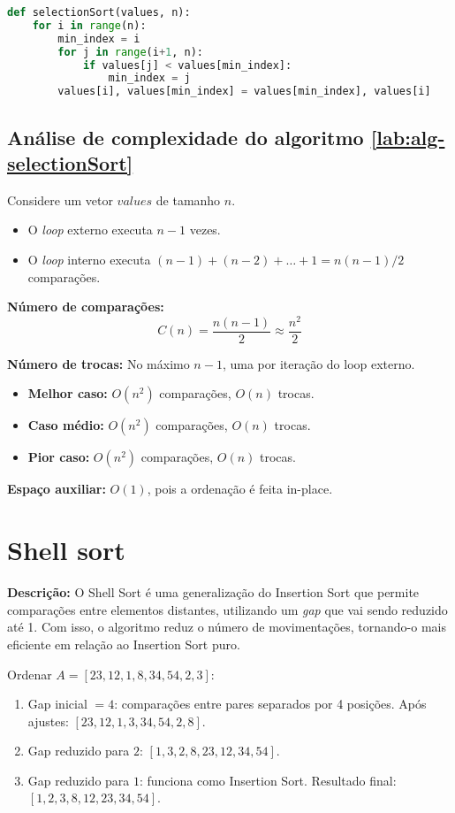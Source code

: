 \begin{lstlisting}[language=python,caption={Selection sort em Python},captionpos=t]
def selectionSort(values, n):
    for i in range(n):
        min_index = i
        for j in range(i+1, n):
            if values[j] < values[min_index]:
                min_index = j
        values[i], values[min_index] = values[min_index], values[i]
\end{lstlisting}

\subsection{Análise de complexidade do algoritmo \ref{lab:alg-selectionSort}}
Considere um vetor $values$ de tamanho $n$.

\begin{itemize}
    \item O \textit{loop} externo executa $n-1$ vezes.
    \item O \textit{loop} interno executa $(n-1)+(n-2)+\dots+1 = n(n-1)/2$ comparações.
\end{itemize}

\noindent\textbf{Número de comparações:}  
\[
C(n) = \frac{n(n-1)}{2} \approx \frac{n^2}{2}
\]

\noindent\textbf{Número de trocas:}  
No máximo $n-1$, uma por iteração do loop externo.

\begin{itemize}
    \item \textbf{Melhor caso:} $O(n^2)$ comparações, $O(n)$ trocas.
    \item \textbf{Caso médio:} $O(n^2)$ comparações, $O(n)$ trocas.
    \item \textbf{Pior caso:} $O(n^2)$ comparações, $O(n)$ trocas.
\end{itemize}

\noindent\textbf{Espaço auxiliar:} $O(1)$, pois a ordenação é feita in-place.

\section{Shell sort}
\textbf{Descrição:} O Shell Sort é uma generalização do Insertion Sort que permite comparações entre elementos distantes, utilizando um \textit{gap} que vai sendo reduzido até 1. Com isso, o algoritmo reduz o número de movimentações, tornando-o mais eficiente em relação ao Insertion Sort puro.

\begin{exmp}
Ordenar $A = [23, 12, 1, 8, 34, 54, 2, 3]$:

\begin{enumerate}
    \item Gap inicial $= 4$: comparações entre pares separados por 4 posições.
    Após ajustes: $[23, 12, 1, 3, 34, 54, 2, 8]$.
    \item Gap reduzido para $2$: $[1, 3, 2, 8, 23, 12, 34, 54]$.
    \item Gap reduzido para $1$: funciona como Insertion Sort.
    Resultado final: $[1, 2, 3, 8, 12, 23, 34, 54]$.
\end{enumerate}
\end{exmp}

